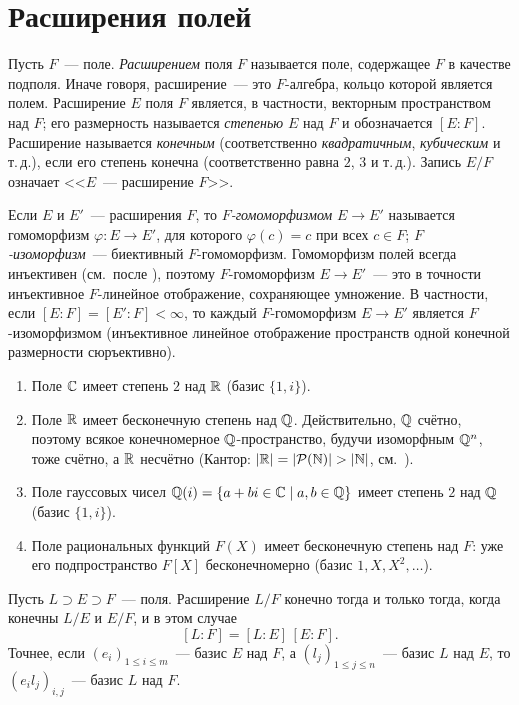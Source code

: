 \section{Расширения полей}

Пусть $F$~--- поле. \emph{Расширением} поля $F$ называется поле, содержащее $F$ в качестве подполя. Иначе говоря,
расширение~--- это $F$-алгебра, кольцо которой является полем. Расширение $E$ поля $F$ является, в частности, векторным
пространством над $F$; его размерность называется \emph{степенью} $E$ над $F$ и обозначается $[E:F]$. Расширение
называется \emph{конечным} (соответственно \emph{квадратичным}, \emph{кубическим} и т.\,д.), если его степень конечна
(соответственно равна $2$, $3$ и т.\,д.). Запись $E/F$ означает <<$E$~--- расширение $F$>>.

Если $E$ и $E'$~--- расширения $F$, то \emph{$F$-гомоморфизмом} $E\to E'$ называется гомоморфизм $\varphi\colon E\to E'$,
для которого $\varphi(c)=c$ при всех $c\in F$; \emph{$F$-изоморфизм}~--- биективный $F$-гомоморфизм. Гомоморфизм полей
всегда инъективен (см.\ после ), поэтому $F$-гомоморфизм $E\to E'$~--- это в
точности инъективное $F$-линейное отображение, сохраняющее умножение. В частности, если $[E:F]=[E':F]<\infty$, то каждый
$F$-гомоморфизм $E\to E'$ является $F$-изоморфизмом (инъективное линейное отображение пространств одной конечной
размерности сюръективно).

\begin{example}[1.19]
\begin{enumerate}[label=(\alph*),leftmargin=*]
\item Поле $\mathbb C$ имеет степень $2$ над $\mathbb R$ (базис $\{1,i\}$).
\item Поле $\mathbb R$ имеет бесконечную степень над $\mathbb Q$. Действительно, $\mathbb Q$ счётно, поэтому всякое конечномерное
$\mathbb Q$-пространство, будучи изоморфным $\mathbb Q^n$, тоже счётно, а $\mathbb R$ несчётно (Кантор: $|\R|=|\mathcal P(\mathbb N)|>|\mathbb N|$, см.\ ).
\item Поле гауссовых чисел $\mathbb Q(i)=\{a+bi\in\mathbb C\mid a,b\in\mathbb Q\}$ имеет степень $2$ над $\mathbb Q$ (базис $\{1,i\}$).
\item Поле рациональных функций $F(X)$ имеет бесконечную степень над $F$: уже его подпространство $F[X]$ бесконечномерно
(базис $1,X,X^2,\dots$).
\end{enumerate}
\end{example}

\begin{proposition}
Пусть $L\supset E\supset F$~--- поля. Расширение $L/F$ конечно тогда и только тогда, когда конечны $L/E$ и $E/F$, и в
этом случае
\[
[L:F]=[L:E]\,[E:F].
\]
Точнее, если $(e_i)_{1\le i\le m}$~--- базис $E$ над $F$, а $(l_j)_{1\le j\le n}$~--- базис $L$ над $E$, то
$(e_il_j)_{i,j}$~--- базис $L$ над $F$.
\end{proposition}

